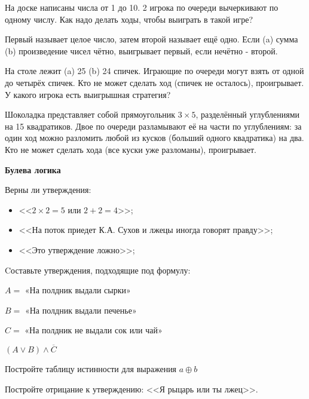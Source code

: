 \documentclass{article}
\begin{document}
    \begin{enumerate_boxed}

        \item На доске написаны числа от 1 до 10.
        2 игрока по очереди вычеркивают по одному числу.
        Как надо делать ходы, чтобы выиграть в такой игре?

        \item Первый называет целое число, затем второй называет ещё одно.
        Если (a) сумма (b) произведение чисел чётно, выигрывает первый, если нечётно - второй.

        \item На столе лежит (a) 25 (b) 24 спичек.
        Играющие по очереди могут взять от одной до четырёх спичек.
        Кто не может сделать ход (спичек не осталось), проигрывает.
        У какого игрока есть выигрышная стратегия?

        \item Шоколадка представляет собой прямоугольник $3 \times 5$, разделённый углублениями на 15 квадратиков.
        Двое по очереди разламывают её на части по углублениям: за один ход можно разломить любой из кусков (больший одного квадратика) на два.
        Кто не может сделать хода (все куски уже разломаны), проигрывает.

    \end{enumerate_boxed}


    \begin{center}
        \textbf{Булева логика}
    \end{center}

    \begin{enumerate_boxed}

        \item Верны ли утверждения:
        \begin{itemize}
            \item <<$2 \times 2 = 5$ или $2 + 2 = 4$>>;

            \item <<На поток приедет К.А. Сухов и лжецы иногда говорят правду>>;

            \item <<Это утверждение ложно>>;
        \end{itemize}

        \item Cоставьте утверждения, подходящие под формулу:

        $A =$ «На полдник выдали сырки»

        $B =$ «На полдник выдали печенье»

        $C =$ «На полдник не выдали сок или чай»

        $(A\vee B)\wedge \overline{C}$


        \item Постройте таблицу истинности для выражения $a \oplus b$

        \item Постройте отрицание к утверждению: <<Я рыцарь или ты лжец>>.

    \end{enumerate_boxed}
\end{document}
